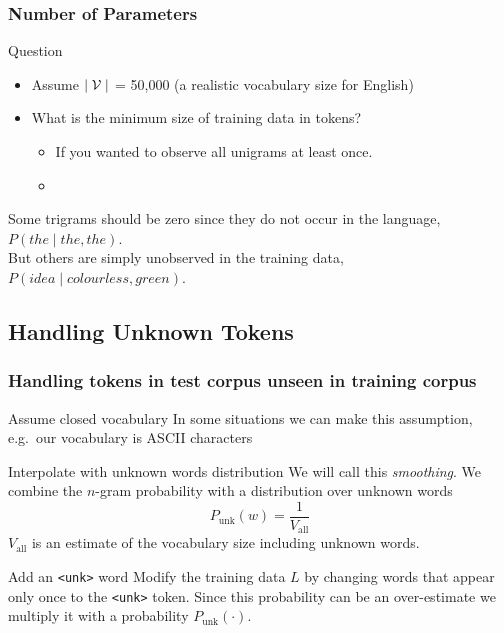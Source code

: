 \begin{frame}
\frametitle{Number of Parameters}
\begin{alertblock}{Question}
\begin{itemize}
\item Assume $\mid {\cal V} \mid$ = 50,000 (a realistic vocabulary size for English)
\item What is the minimum size of training data in tokens?
\begin{itemize}
\item If you wanted to observe all unigrams at least once.
\item {}
\end{itemize}
\end{itemize}
\end{alertblock}
\bigskip
\begin{block}{}
Some trigrams should be zero since they do not occur in the language, $P(the \mid the, the)$. \\
But others are simply unobserved in the training data, $P(idea \mid colourless, green)$.
\end{block}
\end{frame}

\subsection{Handling Unknown Tokens}

\begin{frame}
\frametitle{Handling tokens in test corpus unseen in training corpus}
\begin{block}{Assume closed vocabulary}
In some situations we can make this assumption, e.g.\ our vocabulary is ASCII characters
\end{block}
\pause
\begin{block}{Interpolate with unknown words distribution}
We will call this {\em smoothing}. We combine the $n$-gram probability with a distribution over unknown words 
\smallskip
\[ P_{\textrm{unk}}(w) = \frac{1}{V_{\textrm{all}}} \] 
$V_{\textrm{all}}$ is an estimate of the vocabulary size including unknown words.
\end{block}
\pause
\begin{block}{Add an \texttt{<unk>} word}
Modify the training data $L$ by changing words that appear only once to the \texttt{<unk>} token. Since this probability can be an over-estimate we multiply it with a probability $P_{\textrm{unk}}(\cdot)$.
\end{block}

\end{frame}


